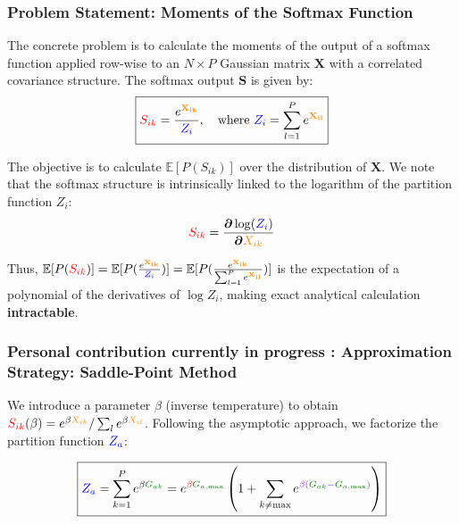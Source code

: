 \documentclass[a4paper]{article}
\theoremstyle{plain}
\theoremstyle{definition}
\theoremstyle{remark}
\begin{document}
\subsubsection{Problem Statement: Moments of the Softmax Function}

The concrete problem is to calculate the moments of the output of a softmax function applied row-wise to an $N \times P$ Gaussian matrix $\mathbf{X}$ with a correlated covariance structure. The softmax output $\mathbf{S}$ is given by:
\begin{equation}
\boxed{ \textcolor{red}{S_{ik}} = \frac{e^{\textcolor{insightcolor}{\mathbf{X_{ik}}}}}{\textcolor{blue}{Z_i}}, \quad \text{where } \textcolor{blue}{Z_i} = \sum_{l=1}^{P} e^{\textcolor{insightcolor}{\mathbf{X_{il}}}}}
\end{equation}

The objective is to calculate $\mathbb{E}[P(S_{ik})]$ over the distribution of $\mathbf{X}$. We note that the softmax structure is intrinsically linked to the logarithm of the partition function $Z_i$:
\begin{equation}
\textcolor{red}{S_{ik}} = \frac{\boldsymbol{\partial} \log(\textcolor{blue}{Z_i})}{\boldsymbol{\partial} \textcolor{insightcolor}{X_{ik}}}
\end{equation}

Thus, $\mathbb{E}[P( \textcolor{red}{S_{ik}})] = \mathbb{E}[P( \frac{e^{\textcolor{insightcolor}{\mathbf{X_{ik}}}}}{\textcolor{blue}{Z_i}})] = \mathbb{E}[P( \frac{e^{\textcolor{insightcolor}{\mathbf{X_{ik}}}}}{\sum_{l=1}^{P} e^{\textcolor{insightcolor}{\mathbf{X_{il}}}}})]$ is the expectation of a polynomial of the derivatives of $\log Z_i$, making exact analytical calculation \textbf{intractable}.



\subsubsection{Personal contribution currently in progress : Approximation Strategy: Saddle-Point Method}

We introduce a parameter $\beta$ (inverse temperature) to obtain $\textcolor{red}{S_{ik}}(\beta) = e^{\beta \textcolor{insightcolor}{X_{ik}}} / \sum_l e^{\beta \textcolor{insightcolor}{X_{il}}}$. Following the asymptotic approach, we factorize the partition function $\textcolor{blue}{Z_a}$:

\begin{equation}
\boxed{\textcolor{blue}{Z_a} = \sum_{k=1}^{P} e^{\beta \textcolor{greencolor}{G_{ak}}} = e^{\textcolor{red}{\beta \textcolor{greencolor}{G_{a, \text{max}}}}} \left( 1 + \sum_{k \neq \text{max}} e^{\textcolor{methodcolor}{\beta (\textcolor{greencolor}{G_{ak}} - \textcolor{greencolor}{G_{a, \text{max}}})}} \right)}
\end{equation}
\end{document}
